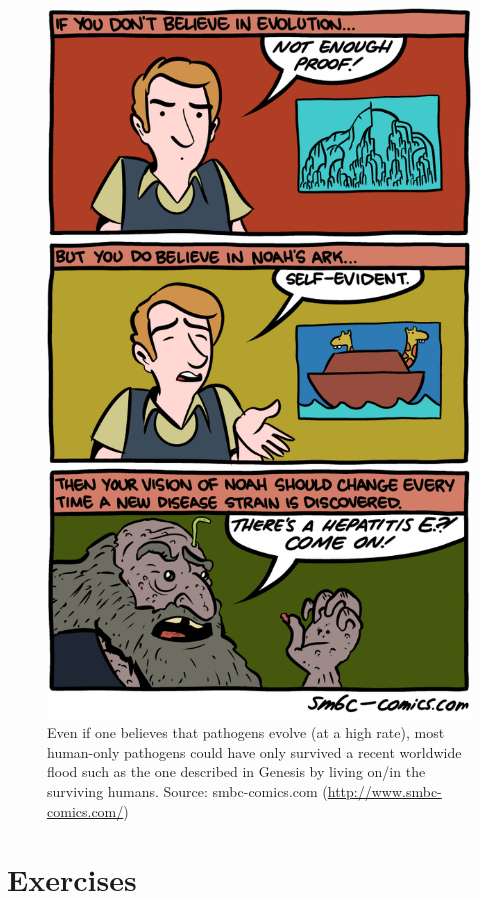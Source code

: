 \documentclass[]{book}
\theoremstyle{definition}
\theoremstyle{definition}
\theoremstyle{definition}
\theoremstyle{remark}
\begin{document}
\begin{figure}
\centering
\includegraphics{./images/smbc-ID-evolution.png}
\caption{Even if one believes that pathogens evolve (at a high rate),
most human-only pathogens could have only survived a recent worldwide
flood such as the one described in Genesis by living on/in the surviving
humans. Source: smbc-comics.com (\url{http://www.smbc-comics.com/})}
\end{figure}

\section{Exercises}\label{exercises-12}
\end{document}
